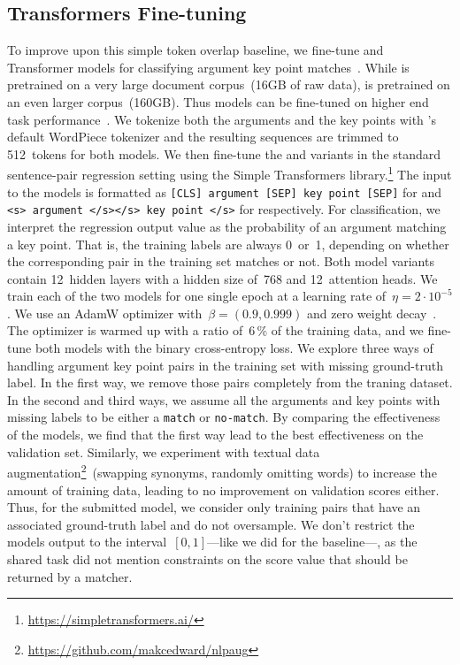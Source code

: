 \subsection{Transformers Fine-tuning}

To improve upon this simple token overlap baseline, we fine-tune \Bert and \Roberta Transformer models for classifying 
argument key point matches~\cite{DevlinCLT2019,LiuOGDJCLLZS2019}.
While \Bert is pretrained on a very large document corpus~(16GB of raw data), \Roberta is pretrained on an even larger corpus~(160GB).
Thus \Roberta models can be fine-tuned on higher end task performance~\cite{LiuOGDJCLLZS2019}.
We tokenize both the arguments and the key points with \Bert's default WordPiece tokenizer and the resulting sequences 
are trimmed to 512~tokens for both models.
We then fine-tune the \BertBase and \RobertaBase variants in the standard sentence-pair regression setting using 
the Simple Transformers library.\footnote{\url{https://simpletransformers.ai/}}
The input to the models is formatted as \texttt{[CLS] argument [SEP] key point [SEP]} for \Bert and \texttt{<s> argument </s></s> key point </s>} for \Roberta respectively.
For classification, we interpret the regression output value as the probability of an argument matching a key point.
That is, the training labels are always 0~or~1, depending on whether the corresponding pair in the training set matches or not.
Both model variants contain 12~hidden layers with a hidden size of~768 and 12~attention heads.
We train each of the two models for one single epoch at a learning rate of~\( \eta = 2 \cdot 10^{-5} \).
We use an AdamW optimizer with~\( \beta = (0.9, 0.999) \) and zero weight decay~\cite{LoshchilovH2019}.
The optimizer is warmed up with a ratio of~6\,\% of the training data, and we fine-tune both models with the binary cross-entropy loss.
We explore three ways of handling argument key point pairs in the training set with missing ground-truth label. In the first way, we remove those pairs completely from the traning dataset. In the second and third ways, we assume all the arguments and key points with missing labels to be either a \texttt{match} or \texttt{no-match}. By comparing the effectiveness of the models, we find that the first way lead to the best effectiveness on the validation set.
Similarly, we experiment with textual data augmentation\footnote{\url{https://github.com/makcedward/nlpaug}}~(swapping synonyms, 
randomly omitting words) to increase the amount of training data, leading to no improvement on validation scores either.
Thus, for the submitted model, we consider only training pairs that have an associated ground-truth label and do not oversample.
We don't restrict the models output to the interval~\([0,1]\)---like we did for the baseline---, as the shared task did not 
mention constraints on the score value that should be returned by a matcher.
